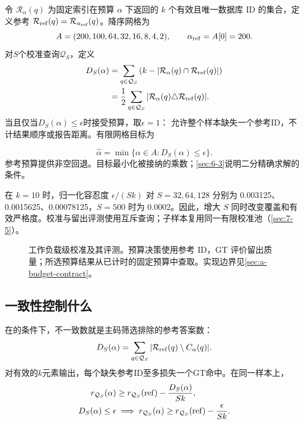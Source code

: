 令 $\mathcal R_\alpha(q)$ 为固定索引在预算 $\alpha$ 下返回的 $k$ 个有效且唯一数据库 ID 的集合，定义参考 $\mathcal R_{\rm ref}(q)=\mathcal R_{\alpha_{\rm ref}}(q)$。降序网格为
\begin{equation}
 A=(200,100,64,32,16,8,4,2),\qquad \alpha_{\rm ref}=A[0]=200.
 \label{eq:6-grid}
\end{equation}
对$S$个校准查询$\mathcal Q_S$，定义
\begin{equation}
 \begin{aligned}
 D_S(\alpha)
 &=\sum_{q\in\mathcal Q_S}
   \left(k-|\mathcal R_\alpha(q)\cap\mathcal R_{\rm ref}(q)|\right)\\
 &=\frac12\sum_{q\in\mathcal Q_S}
   |\mathcal R_\alpha(q)\triangle\mathcal R_{\rm ref}(q)|.
 \end{aligned}
 \label{eq:6-agreement}
\end{equation}
当且仅当$D_S(\alpha)\leq\epsilon$时接受预算，取$\epsilon=1$：
允许整个样本缺失一个参考ID，不计结果顺序或报告距离。有限网格目标为

\begin{equation}
 \widehat\alpha=\min\{\alpha\in A:D_S(\alpha)\leq\epsilon\}.
 \label{eq:6-selection-objective}
\end{equation}
参考预算提供非空回退。目标最小化被接纳的乘数；\cref{sec:6-3}说明二分精确求解的条件。

在 $k=10$ 时，归一化容忍度 $\epsilon/(Sk)$ 对 $S=32,64,128$ 分别为 0.003125、0.0015625、0.00078125，$S=500$ 时为 0.0002。因此，增大 $S$ 同时改变覆盖和有效严格度。校准与留出评测使用互斥查询；子样本复用同一有限校准池（\cref{sec:7-5}）。

\begin{figure}[htbp]
\centering

\caption[工作负载级校准与评测]{工作负载级校准及其评测。预算决策使用参考 ID，GT 评价留出质量；所选预算结果从已计时的固定预算中查取。实现边界见\cref{sec:a-budget-contract}。}
\label{fig:6-calibration}
\end{figure}

\subsection{一致性控制什么}

在的条件下，不一致数就是主码筛选排除的参考答案数：
\begin{equation}
 D_S(\alpha)=\sum_{q\in\mathcal Q_S}
       |\mathcal R_{\rm ref}(q)\setminus C_\alpha(q)|.
 \label{eq:6-reference-coverage}
\end{equation}
对有效的$k$元素输出，每个缺失参考ID至多损失一个GT命中。在同一样本上，
\begin{equation}
 \begin{aligned}
 r_{\mathcal Q_S}(\alpha)
 &\geq r_{\mathcal Q_S}({\rm ref})-\frac{D_S(\alpha)}{Sk},\\
 D_S(\alpha)\leq\epsilon
 &\implies r_{\mathcal Q_S}(\alpha)
       \geq r_{\mathcal Q_S}({\rm ref})-\frac{\epsilon}{Sk}.
 \end{aligned}
 \label{eq:6-relative-recall}
\end{equation}

